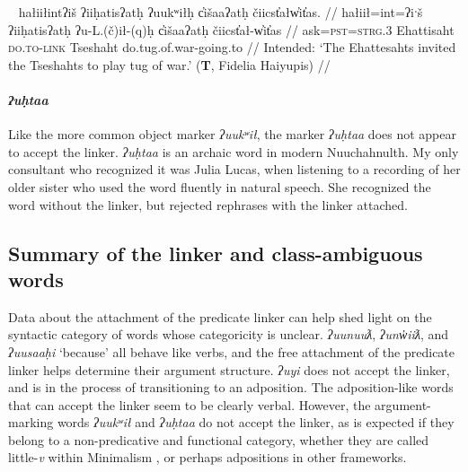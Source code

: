 \ex~ \label{ex:tugofwar2}
\begingl
\glpreamble *hałiiłintʔiš ʔiiḥatisʔatḥ ʔuukʷiłḥ c̓išaaʔatḥ čiicst̓ałw̓it̓as. //
\gla hałiił=int=ʔiˑš ʔiiḥatisʔatḥ ʔu-L.(č)ił-(q)ḥ c̓išaaʔatḥ čiicst̓ał-w̓it̓as //
\glb ask=\textsc{pst}=\textsc{strg.3} Ehattisaht \textsc{do.to}-\textsc{link} Tseshaht do.tug.of.war-going.to //
\glft Intended: `The Ehattesahts invited the Tseshahts to play tug of war.' (\textbf{T}, Fidelia Haiyupis) //
\endgl
\xe

\paragraph{\textit{ʔuḥtaa}} \label{ch:link:uhta} Like the more common object marker \textit{ʔuukʷił}, the marker \textit{ʔuḥtaa} does not appear to accept the linker. \textit{ʔuḥtaa} is an archaic word in modern Nuuchahnulth. My only consultant who recognized it was Julia Lucas, when listening to a recording of her older sister who used the word fluently in natural speech. She recognized the word without the linker, but rejected rephrases with the linker attached.

\begin{comment}
\vspace{5pt}

\noindent Context for (\ref{ex:uhta}, \ref{ex:uhtaqh}), discussing family relations.

\ex \label{ex:uhta}
\begingl
\glpreamble ʔuḥtaa Jane ʔuʔukʷił Alexandra y̓ukʷiiqsu. //
\gla ʔuḥtaa Jane ʔuʔukʷił Alexandra y̓ukʷiiqsu //
\glb only.\textsc{do.to} Jane call Alexandra younger.sibling //
\glft `Only Jane can call Alexandra younger.' (\textbf{C}, \textit{tupaat} Julia Lucas) //
\endgl
\xe

\ex~ \label{ex:uhtaqh}
\begingl
\glpreamble *ʔuḥtaaqḥ Jane ʔuʔukʷił Alexandra y̓ukʷiiqsu. //
\gla ʔuḥtaa-(q)ḥ Jane ʔuʔukʷił Alexandra y̓ukʷiiqsu //
\glb only.\textsc{do.to}-\textsc{link} Jane call Alexandra younger.sibling //
\glft Intended: `Only Jane can call Alexandra younger.' (\textbf{C}, \textit{tupaat} Julia Lucas) //
\endgl
\xe
\end{comment}

\subsection{Summary of the linker and class-ambiguous words}

Data about the attachment of the predicate linker can help shed light on the syntactic category of words whose categoricity is unclear. \textit{ʔuunuuƛ}, \textit{ʔunw̓iiƛ}, and \textit{ʔuusaaḥi} `because' all behave like verbs, and the free attachment of the predicate linker helps determine their argument structure. \textit{ʔuyi} does not accept the linker, and is in the process of transitioning to an adposition. The adposition-like words that can accept the linker seem to be clearly verbal. However, the argument-marking words \textit{ʔuukʷił} and \textit{ʔuḥtaa} do not accept the linker, as is expected if they belong to a non-predicative and functional category, whether they are called little-\textit{v} within Minimalism \citep{woo2007b}, or perhaps adpositions in other frameworks.


